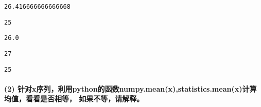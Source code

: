 \documentclass[11pt]{article}
\makeatletter
\newcommand{\boxspacing}{\kern\kvtcb@left@rule\kern\kvtcb@boxsep}
\newcommand{\prompt}[4]{
        \ttfamily\llap{{\color{#2}[#3]:\hspace{3pt}#4}}\vspace{-\baselineskip}
    }
\makeatother
\begin{document}
            \begin{tcolorbox}[breakable, size=fbox, boxrule=.5pt, pad at break*=1mm, opacityfill=0]
\prompt{Out}{outcolor}{4}{\boxspacing}
\begin{Verbatim}[commandchars=\\\{\}]
26.416666666666668
\end{Verbatim}
\end{tcolorbox}
        
            \begin{tcolorbox}[breakable, size=fbox, boxrule=.5pt, pad at break*=1mm, opacityfill=0]
\prompt{Out}{outcolor}{4}{\boxspacing}
\begin{Verbatim}[commandchars=\\\{\}]
25
\end{Verbatim}
\end{tcolorbox}
        
            \begin{tcolorbox}[breakable, size=fbox, boxrule=.5pt, pad at break*=1mm, opacityfill=0]
\prompt{Out}{outcolor}{4}{\boxspacing}
\begin{Verbatim}[commandchars=\\\{\}]
26.0
\end{Verbatim}
\end{tcolorbox}
        
            \begin{tcolorbox}[breakable, size=fbox, boxrule=.5pt, pad at break*=1mm, opacityfill=0]
\prompt{Out}{outcolor}{4}{\boxspacing}
\begin{Verbatim}[commandchars=\\\{\}]
27
\end{Verbatim}
\end{tcolorbox}
        
            \begin{tcolorbox}[breakable, size=fbox, boxrule=.5pt, pad at break*=1mm, opacityfill=0]
\prompt{Out}{outcolor}{4}{\boxspacing}
\begin{Verbatim}[commandchars=\\\{\}]
25
\end{Verbatim}
\end{tcolorbox}
        
    \hypertarget{ux9488ux5bf9xux5e8fux5217ux5229ux7528pythonux7684ux51fdux6570numpy.meanx-statistics.meanxux8ba1ux7b97ux5747ux503cux770bux770bux662fux5426ux76f8ux7b49ux5982ux679cux4e0dux7b49ux8bf7ux89e3ux91ca}{%
\paragraph{(2) 针对x序列，利用python的函数numpy.mean(x),statistics.mean(x)计算均值，看看是否相等，
如果不等，请解释。}\label{ux9488ux5bf9xux5e8fux5217ux5229ux7528pythonux7684ux51fdux6570numpy.meanx-statistics.meanxux8ba1ux7b97ux5747ux503cux770bux770bux662fux5426ux76f8ux7b49ux5982ux679cux4e0dux7b49ux8bf7ux89e3ux91ca}}
\end{document}
